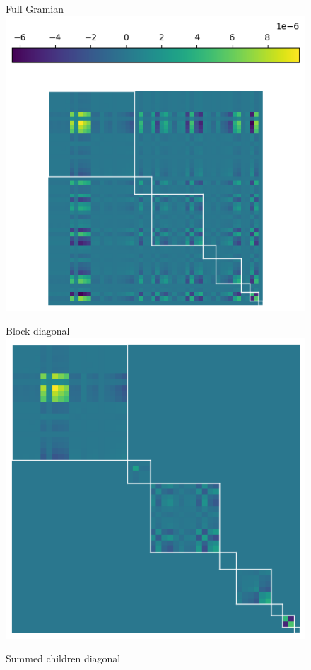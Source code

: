 \begin{figure}
  \centering
  Full Gramian\\
  \includegraphics[width=0.43\linewidth]{../kfac_pinns_exp/exp04_gramian_contributions/fig/gram_full.png}

  \begin{minipage}[t]{0.325\linewidth}
    \centering
    Block diagonal
    \includegraphics[width=\linewidth]{../kfac_pinns_exp/exp04_gramian_contributions/fig/gram_block_diag.png}
  \end{minipage}
  \hfill
  \begin{minipage}[t]{0.325\linewidth}
    \centering
    Summed children diagonal

\end{minipage}
\end{figure}
